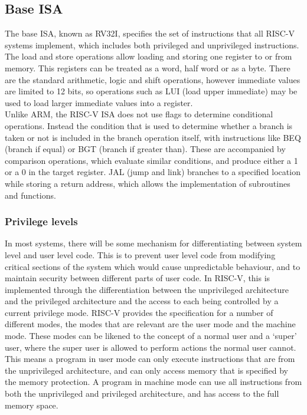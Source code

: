 \subsection{Base ISA}
The base ISA, known as RV32I, specifies the set of instructions that all RISC-V systems implement, which includes both privileged and unprivileged instructions. The load and store operations allow loading and storing one register to or from memory. This registers can be treated as a word, half word or as a byte. There are the standard arithmetic, logic and shift operations, however immediate values are limited to 12 bits, so operations such as LUI (load upper immediate) may be used to load larger immediate values into a register.\\
Unlike ARM, the RISC-V ISA does not use flags to determine conditional operations. Instead the condition that is used to determine whether a branch is taken or not is included in the branch operation itself, with instructions like BEQ (branch if equal) or BGT (branch if greater than). These are accompanied by comparison operations, which evaluate similar conditions, and produce either a 1 or a 0 in the target register. JAL (jump and link) branches to a specified location while storing a return address, which allows the implementation of subroutines and functions\cite{riscv_unpriv}.
\subsubsection{Privilege levels}
In most systems, there will be some mechanism for differentiating between system level and user level code. This is to prevent user level code from modifying critical sections of the system which would cause unpredictable behaviour, and to maintain security between different parts of user code. In RISC-V, this is implemented through the differentiation between the unprivileged architecture and the privileged architecture and the access to each being controlled by a current privilege mode. RISC-V provides the specification for a number of different modes, the modes that are relevant are the user mode and the machine mode. These modes can be likened to the concept of a normal user and a `super' user, where the super user is allowed to perform actions the normal user cannot. This means a program in user mode can only execute instructions that are from the unprivileged architecture, and can only access memory that is specified by the memory protection. A program in machine mode can use all instructions from both the unprivileged and privileged architecture, and has access to the full memory space.
